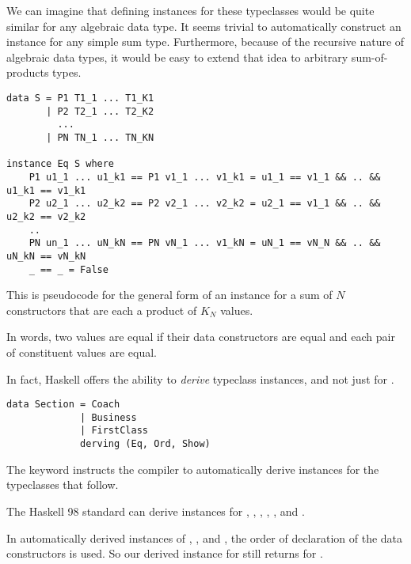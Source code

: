 We can imagine that defining instances for these typeclasses would be quite similar for any algebraic
data type. It seems trivial to automatically construct an  instance for any simple sum type.
Furthermore, because of the recursive nature of algebraic data types, it would be easy to extend that
idea to arbitrary sum-of-products types. 

\begin{lstlisting}
data S = P1 T1_1 ... T1_K1
       | P2 T2_1 ... T2_K2
         ...
       | PN TN_1 ... TN_KN

instance Eq S where
    P1 u1_1 ... u1_k1 == P1 v1_1 ... v1_k1 = u1_1 == v1_1 && .. && u1_k1 == v1_k1
    P2 u2_1 ... u2_k2 == P2 v2_1 ... v2_k2 = u2_1 == v1_1 && .. && u2_k2 == v2_k2
    ..
    PN un_1 ... uN_kN == PN vN_1 ... v1_kN = uN_1 == vN_N && .. && uN_kN == vN_kN
    _ == _ = False
\end{lstlisting}

\begin{notelist}
    \item This is pseudocode for the general form of an  instance for a sum of
          $N$ constructors that are each a product of $K_N$ values.
    \item In words, two  values are equal if their data constructors are equal and
          each pair of constituent values are equal.
\end{notelist}

In fact, Haskell offers the ability to \textit{derive} typeclass instances, and not just for 
.

\begin{lstlisting}
data Section = Coach
             | Business
             | FirstClass
             derving (Eq, Ord, Show)
\end{lstlisting}

\begin{notelist}
    \item The  keyword instructs the compiler to automatically derive instances
          for the typeclasses that follow.
    \item The Haskell 98 standard can derive instances for , , ,
          , , and .
    \item In automatically derived instances of , , and ,
          the order of declaration of the data constructors is used. So our derived
           instance for  still returns  for  .
\end{notelist}

